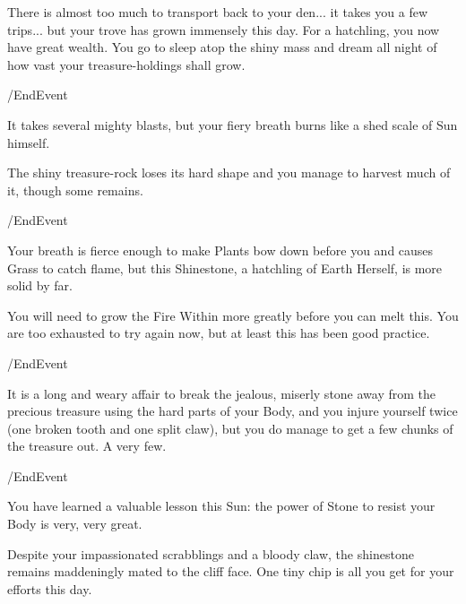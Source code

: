 There is almost too much to transport back to your den... it takes you a few
trips... but your trove has grown immensely this day. For a hatchling, you now
have great wealth. You go to sleep atop the shiny mass and dream all night of
how vast your treasure-holdings shall grow.

\option /EndEvent
	  
	   



It takes several mighty blasts, but your fiery breath burns like a shed scale
of Sun himself.

The shiny treasure-rock loses its hard shape and you manage to harvest much of
it, though some remains.

\option /EndEvent 
  


Your breath is fierce enough to make Plants bow down before you and causes Grass
to catch flame, but this Shinestone, a hatchling of Earth Herself, is more solid
by far.

You will need to grow the Fire Within more greatly before you can melt this. You
are too exhausted to try again now, but at least this has been good practice.

\option /EndEvent 
  



It is a long and weary affair to break the jealous, miserly stone away from the
precious treasure using the hard parts of your Body, and you injure yourself
twice (one broken tooth and one split claw), but you do manage to get a few
chunks of the treasure out. A very few.

\option /EndEvent 
	  


You have learned a valuable lesson this Sun: the power of Stone to resist your
Body is very, very great.

Despite your impassionated scrabblings and a bloody claw, the shinestone
remains maddeningly mated to the cliff face. One tiny chip is all you get for
your efforts this day.

